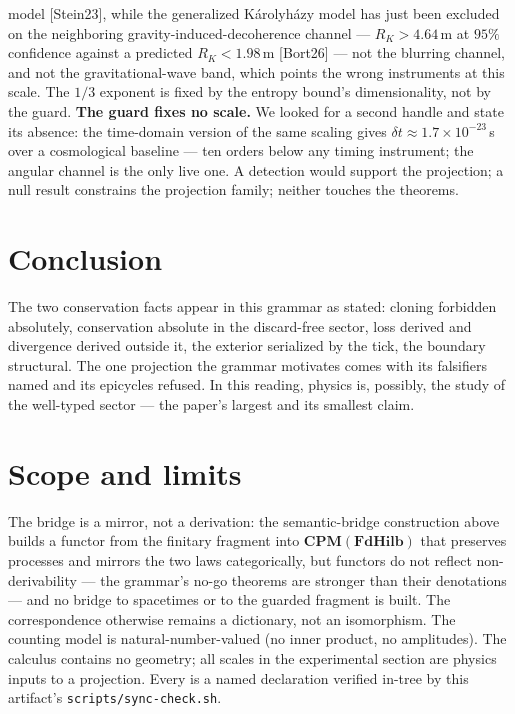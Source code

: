 \documentclass[11pt]{article}
\begin{document}
model [Stein23], while the generalized K\'arolyh\'azy model has just been
excluded on the neighboring gravity-induced-decoherence channel ---
$R_K > 4.64\,$m at $95\%$ confidence against a predicted $R_K < 1.98\,$m
[Bort26] --- not the blurring channel, and not the gravitational-wave
band, which points the wrong instruments at this scale.
The $1/3$ exponent is fixed by the entropy bound's dimensionality, not by
the guard. \textbf{The guard fixes no scale.} We looked for a second
handle and state its absence: the time-domain version of the same scaling
gives $\delta t \approx 1.7\times10^{-23}\,$s over a cosmological baseline
--- ten orders below any timing instrument; the angular channel is the
only live one. A detection would support the
projection; a null result constrains the projection family; neither touches
the theorems.

\section{Conclusion}

The two conservation facts appear in this grammar as stated: cloning
forbidden absolutely, conservation absolute in the discard-free sector, loss
derived and divergence derived outside it, the exterior serialized by the
tick, the boundary structural. The one projection the grammar motivates comes
with its falsifiers named and its epicycles refused. In this reading, physics
is, possibly, the study of the well-typed sector --- the paper's largest
\interp{} and its smallest claim.

\section*{Scope and limits}
The bridge is a mirror, not a derivation: the semantic-bridge construction above builds a functor from
the finitary fragment into $\mathbf{CPM}(\mathbf{FdHilb})$ that preserves
processes and mirrors the two laws categorically, but functors do not
reflect non-derivability --- the grammar's no-go theorems are stronger than
their denotations --- and no bridge to spacetimes or to the guarded
fragment is built. The correspondence otherwise remains a dictionary, not
an isomorphism. The counting model is natural-number-valued (no inner
product, no amplitudes). The calculus contains no geometry; all scales in
the experimental section are physics inputs to a projection. Every
 is a named \dcn{} declaration verified in-tree by this
artifact's \texttt{scripts/sync-check.sh}.
\end{document}
